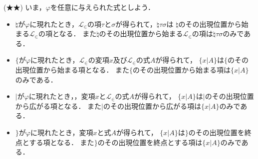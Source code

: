 	\begin{screen}
		(★★) いま，$\varphi$を任意に与えられた式としよう．
		\begin{itemize}
			\item $\natural$が$\varphi$に現れたとき，$\mathcal{L}_{\in}$の項$\tau$と$\sigma$が得られて，$\natural \tau \sigma$は
				$\natural$のその出現位置から始まる$\mathcal{L}_{\in}$の項となる．
				また$\natural$のその出現位置から始まる$\mathcal{L}_{\in}$の項は$\natural \tau \sigma$のみである．
				
			\item $\{$が$\varphi$に現れたとき，$\mathcal{L}_{\in}$の変項$x$及び$\mathcal{L}_{\in}$の式$A$が得られて，
				$\{ x|A\}$は$\{$のその出現位置から始まる項となる．
				また$\{$のその出現位置から始まる項は$\{x|A\}$のみである．
				
			\item $|$が$\varphi$に現れたとき，，変項$x$と$\mathcal{L}_{\in}$の式$A$が得られて，
				$\{x|A\}$は$|$のその出現位置から広がる項となる．
				また$|$のその出現位置から広がる項は$\{x|A\}$のみである．
				
			\item $\}$が$\varphi$に現れたとき，変項$x$と式$A$が得られて，
				$\{x|A\}$は$\}$のその出現位置を終点とする項となる．
				また$\}$のその出現位置を終点とする項は$\{x|A\}$のみである．
		\end{itemize}
	\end{screen}
	

